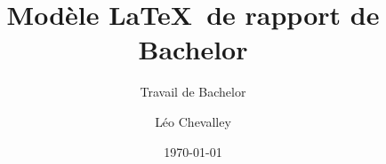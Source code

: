 \author{Léo Chevalley}


\title{Modèle \LaTeX~de rapport de Bachelor}

\subtitle{Travail de Bachelor}


\date{\today}



